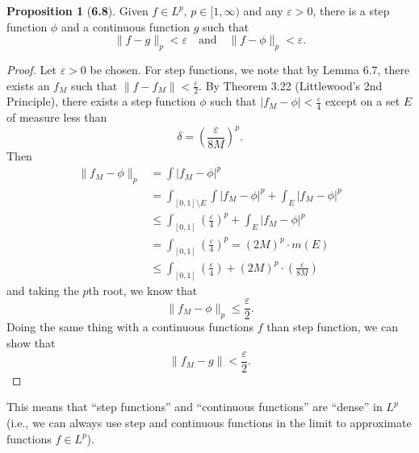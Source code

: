 \documentclass[12pt]{article}
\renewcommand{\epsilon}{\varepsilon}
\theoremstyle{definition}
\newtheorem*{prop}{Proposition}
\begin{document}
\begin{prop}[\textbf{6.8}]

    Given \( f \in L^p \), \( p \in [1, \infty) \) and any \( \epsilon > 0 \), there is a step function \( \phi \) and a continuous function \( g\) such that 
        \[
            \lVert f - g\rVert_{p} < \epsilon \quad \text{and} \quad \lVert f - \phi \rVert_p < \epsilon.
        \]  
        \begin{proof}
            Let \( \epsilon > 0 \) be chosen. For step functions, we note that by Lemma 6.7, there exists 
            an \( f_M \) such that \( \displaystyle \lVert f - f_M \rVert < \frac{\epsilon}{2} \). By Theorem 3.22 (Littlewood's 2nd Principle), there exists a step function \( \phi \) such that \( |f_M - \phi| < \frac{\epsilon}{4} \) except on a set \( E \) of measure less than 
                \[
                    \delta = \left( \frac{\epsilon}{8M} \right)^p.  
                \]
            Then
                \begin{align*}
                    \lVert f_M - \phi \rVert_{p} &= \int |f_M - \phi|^p \\
                    &= \int_{[0,1] \setminus E} \int |f_M - \phi|^p + \int_{E} |f_M - \phi|^p \\
                    &\leq \int_{[0,1]} \left( \frac{\epsilon}{4}  \right)^{p} + \int_{E} |f_M - \phi|^p  \\
                    &=\int_{[0,1]} \left( \frac{\epsilon}{4}  \right)^{p} = (2M)^p \cdot m(E) \\
                    &\leq \int_{[0,1]} \left( \frac{\epsilon}{4} \right) + (2M)^p \cdot \left( \frac{\epsilon}{8M}\right)
                \end{align*}
            and taking the \( p \)th root, we know that
                \[
                    \lVert f_M - \phi \rVert_p \leq \frac{\epsilon}{2}.  
                \]
            Doing the same thing with a continuous functions \( f\) than step function, we can show that
                \[
                    \lVert f_M - g \rVert < \frac{\epsilon}{2}.  
                \]
        \end{proof}
\end{prop}

This means that ``step functions'' and ``continuous functions'' are ``dense'' in \( L^p \) (i.e., we can always use step and continuous functions in the limit to approximate functions \( f \in L^p\)).
\end{document}
